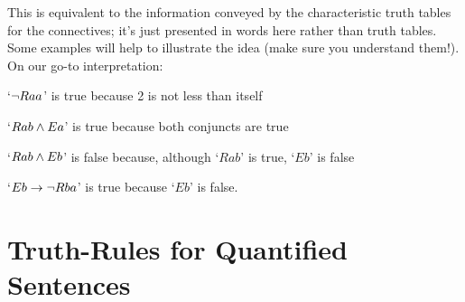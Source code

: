 This  is equivalent to the information conveyed by the characteristic truth tables for the connectives; it's just presented in words here rather than truth tables.   Some examples will help to illustrate the idea (make sure you understand them!). On our go-to interpretation:
	\begin{earg}
		\item[\textbullet]  `$\neg Raa$' is true because 2 is not less than itself
		\item[\textbullet] `$Rab \wedge Ea$' is true because both conjuncts are true
		\item[\textbullet] `$Rab \wedge Eb$' is false because, although `$Rab$' is true, `$Eb$' is false
		\item[\textbullet] `$Eb \rightarrow \neg Rba$' is true because `$Eb$' is false.
		\end{earg}

\section{Truth-Rules for Quantified Sentences}\label{s:TruthQuantifiedSentences}

